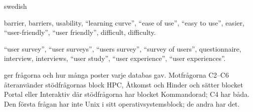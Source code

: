 \begin{onlyin}{swedish}
\begin{description}
    barrier, barriers, usability, \enquote{learning curve}, \enquote{ease
    of use}, \enquote{easy to use}, easier, \enquote{user-friendly},
    \enquote{user friendly}, difficult, difficulty.
  \item[Enkät] \enquote{user survey}, \enquote{user surveys},
    \enquote{users survey}, \enquote{survey of users}, questionnaire,
    interview, interviews, \enquote{user study}, \enquote{user
    experience}, \enquote{user experiences}.
\end{description}
\par\endgroup
{} ger frågorna och hur många poster varje
databas gav.  Motfrågorna C2--C6 återanvänder stödfrågornas block HPC,
Åtkomst och Hinder och sätter blocket Portal eller Interaktiv där
stödfrågorna har blocket Kommandorad; C4 har båda.  Den första frågan har
inte Unix i sitt operativsystemsblock; de andra har det.
\end{onlyin}


